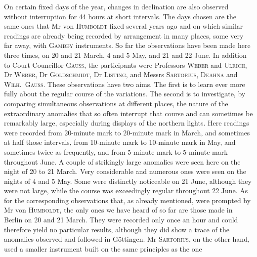 On certain fixed days of the year, changes in declination are also observed without interruption for 44 hours at short intervals. The days chosen are the same ones that Mr von \textsc{Humboldt} fixed several years ago and on which similar readings are already being recorded by arrangement in many places, some very far away, with \textsc{Gambey} instruments. So far the observations have been made here three times, on 20 and 21 March, 4 and 5 May, and 21 and 22 June. In addition to Court Councillor \textsc{Gauss}, the participants were Professors \textsc{Weber} and \textsc{Ulrich}, Dr \textsc{Weber}, Dr \textsc{Goldschmidt}, Dr \textsc{Listing}, and Messrs \textsc{Sartorius}, \textsc{Deahna} and \textsc{Wilh.\ Gauss}. These observations have two aims. The first is to learn ever more fully about the regular course of the variations. The second is to investigate, by comparing simultaneous observations at different places, the nature of the extraordinary anomalies that so often interrupt that course and can sometimes be remarkably large, especially during displays of the northern lights. Here readings were recorded from 20-minute mark to 20-minute mark in March, and sometimes at half those intervals, from 10-minute mark to 10-minute mark in May, and sometimes twice as frequently, and from 5-minute mark to 5-minute mark throughout June. A couple of strikingly large anomalies were seen here on the night of 20 to 21 March. Very considerable and numerous ones were seen on the nights of 4 and 5 May. Some were distinctly noticeable on 21 June, although they were not large, while the course was exceedingly regular throughout 22 June. As for the corresponding observations that, as already mentioned, were prompted by Mr von \textsc{Humboldt}, the only ones we have heard of so far are those made in Berlin on 20 and 21 March. They were recorded only once an hour and could therefore yield no particular results, although they did show a trace of the anomalies observed and followed in Göttingen. Mr \textsc{Sartorius}, on the other hand, used a smaller instrument built on the same principles as the one
